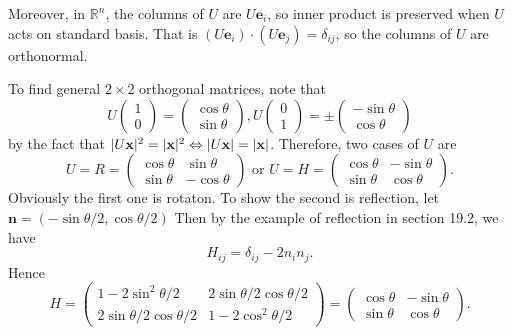 \documentclass[10pt]{article}
\begin{document}
    Moreover, in $ \mathbb{R}^{n} $, the columns of $U$ are $ U \mathbf{e}_i $, so inner product is preserved when $U$ acts on standard basis. That is $ (U \mathbf{e}_i)\cdot(U\mathbf{e}_j) =\delta_{ij}$, so the columns of $U$ are orthonormal.
    \begin{example}
        To find general $2\times 2$ orthogonal matrices, note that 
        \[
            U\begin{pmatrix}
                1\\0
            \end{pmatrix}=\begin{pmatrix}
                \cos \theta\\ \sin \theta
            \end{pmatrix},
            U\begin{pmatrix}
                0\\1
            \end{pmatrix}=\pm \begin{pmatrix}
                -\sin \theta\\ \cos \theta
            \end{pmatrix}
        \]
        by the fact that $ |U \mathbf{x}|^2=|{\bf x}|^2 \Leftrightarrow |U \mathbf{x}|=| \mathbf{x}| $. Therefore, two cases of $U$ are 
        \[
            U=R=\begin{pmatrix}
                \cos \theta & \sin \theta\\
                \sin \theta & -\cos \theta
            \end{pmatrix} \text{ or } U=H=\begin{pmatrix}
                \cos \theta & -\sin \theta\\
                \sin \theta & \cos \theta
            \end{pmatrix}
        .\]
        Obviously the first one is rotaton. To show the second is reflection, let $ \mathbf{n}=(-\sin \theta/2, \cos \theta/2) $ Then by the example of reflection in section 19.2, we have 
        \[
            H_{ij}=\delta_{ij}-2n_in_j
        .\]
        Hence 
        \[
            H=\begin{pmatrix}
                1-2 \sin ^{2} \theta / 2 & 2 \sin \theta / 2 \cos \theta / 2 \\
                2 \sin \theta / 2 \cos \theta / 2 & 1-2 \cos ^{2} \theta / 2
            \end{pmatrix}=\begin{pmatrix}
                \cos \theta & -\sin \theta\\
                \sin \theta & \cos \theta
            \end{pmatrix}
        .\]
    \end{example}
\end{document}
